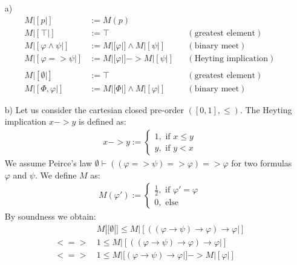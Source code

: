 \begin{answer}
    \begin{itemize}
        \item[a)]
            \begin{align*}
                M|[p|] & := M(p)\\
                M|[\top|] & := \top && (\text{greatest element})\\
                M|[\varphi \land \psi|] & := M|[\varphi|] \land M|[\psi|] && (\text{binary meet})\\
                M|[\varphi => \psi|] & := M|[\varphi|] -> M|[\psi|] && (\text{Heyting implication})\\
                \\
                M|[\emptyset|] & := \top && (\text{greatest element})\\
                M|[\Phi, \varphi|] & := M|[\Phi|] \land M|[\varphi|] && (\text{binary meet})
            \end{align*}
        \item[b)] Let us consider the cartesian closed pre-order $([0,1], \le)$.
            The Heyting implication $x -> y$ is defined as:
            \begin{align*}
                x -> y := \begin{cases}
                    1, \text{ if } x \le y\\
                    y, \text{ if } y < x
                       \end{cases}
            \end{align*}
            We assume Peirce's law $\emptyset \vdash ((\varphi => \psi) => \varphi) => \varphi$ for two formulas $\varphi$ and $\psi$.
            We define $M$ as:
            \begin{align*}
                M(\varphi') := \begin{cases}
                        \frac{1}{2}, \text{ if } \varphi' = \varphi\\
                        0, \text{ else}
                    \end{cases}
            \end{align*}
            By soundness we obtain:
            \begin{align*}
                      & M|[\emptyset|] \le M|[((\varphi \to \psi) \to \varphi) \to \varphi|] \\
                <=>\, & 1 \le M|[((\varphi \to \psi) \to \varphi) \to \varphi|] \\
                <=>\, & 1 \le M|[(\varphi \to \psi) \to \varphi|] -> M|[\varphi|] \\

\end{align*}
\end{itemize}
\end{answer}
